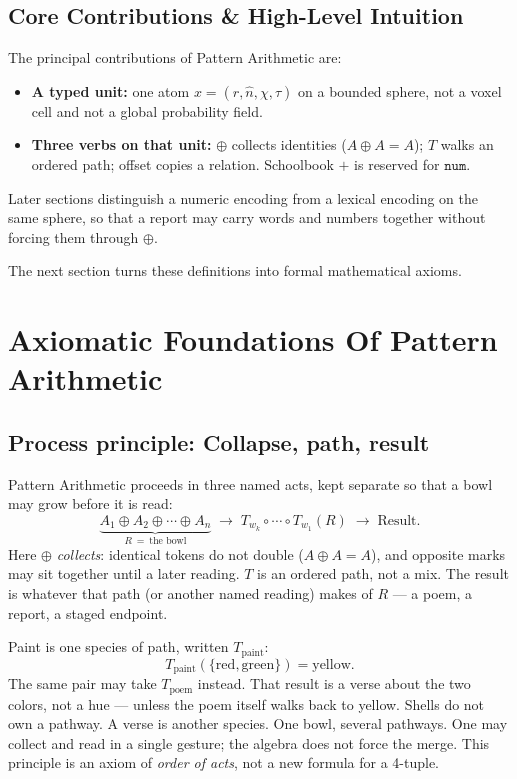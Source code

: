 \documentclass[12pt, a4paper]{article}
\begin{document}
\subsection{Core Contributions \& High-Level Intuition}
The principal contributions of Pattern Arithmetic are:
\begin{itemize}
    \item \textbf{A typed unit:} one atom $x=(r,\hat n,\chi,\tau)$ on a bounded sphere, not a voxel cell and not a global probability field.
    \item \textbf{Three verbs on that unit:} $\oplus$ collects identities ($A\oplus A=A$); $T$ walks an ordered path; offset copies a relation. Schoolbook $+$ is reserved for $\mathtt{num}$.
\end{itemize}

Later sections distinguish a numeric encoding from a lexical encoding on the same sphere, so that a report may carry words and numbers together without forcing them through $\oplus$.

The next section turns these definitions into formal mathematical axioms.


\section{Axiomatic Foundations Of Pattern Arithmetic}

\subsection{Process principle: Collapse, path, result}
\label{subsec:process_principle}
Pattern Arithmetic proceeds in three named acts, kept separate so that a bowl may grow before it is read:
\begin{equation}
    \underbrace{A_1 \oplus A_2 \oplus \cdots \oplus A_n}_{R\ =\ \text{the bowl}}
    \;\longrightarrow\;
    T_{w_k}\circ \cdots \circ T_{w_1}(R)
    \;\longrightarrow\;
    \text{Result}.
    \label{eq:pipeline}
\end{equation}
Here $\oplus$ \emph{collects}: identical tokens do not double ($A \oplus A = A$), and opposite marks may sit together until a later reading. $T$ is an ordered path, not a mix. The result is whatever that path (or another named reading) makes of $R$ --- a poem, a report, a staged endpoint.

Paint is one species of path, written $T_{\mathrm{paint}}$:
\[
T_{\mathrm{paint}}(\{\mathrm{red},\mathrm{green}\}) = \mathrm{yellow}.
\]
The same pair may take $T_{\mathrm{poem}}$ instead. That result is a
verse about the two colors, not a hue --- unless the poem itself
walks back to yellow. Shells do not own a pathway. A verse is another
species. One bowl, several pathways. One may collect
and read in a single gesture; the algebra does not force the merge.
This principle is an axiom of \emph{order of acts}, not a new formula
for a 4-tuple.
\end{document}
